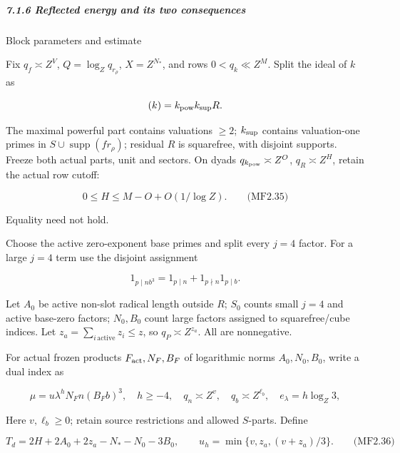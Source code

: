 \hypertarget{reflected-energy-and-its-two-consequences-heading-2}{%
\subparagraph{7.1.6 Reflected energy and its two consequences}}

\hypertarget{block-parameters-and-estimate}{}

\label{block-parameters-and-estimate}

Block parameters and estimate

Fix \(q_f\asymp Z^V\), \(Q=\log_Zq_{r_\rho}\), \(X=Z^{N_*}\), and rows \(0<q_k\ll Z^M\). Split the ideal of \(k\) as

\[
(k)=k_{\rm pow}k_{\rm sup}R.
\]

The maximal powerful part contains valuations \(\ge2\); \(k_{\rm sup}\) contains valuation-one primes in \(S\cup\operatorname{supp}(fr_\rho)\); residual \(R\) is squarefree, with disjoint supports. Freeze both actual parts, unit and sectors. On dyads \(q_{k_{\rm pow}}\asymp Z^O\), \(q_R\asymp Z^H\), retain the actual row cutoff:

\hypertarget{mf:eq:B2.35}{}

\label{mf:eq:B2.35}

\[
0\le H\le M-O+O(1/\log Z).
\qquad\text{(MF2.35)}
\]

Equality need not hold.

Choose the active zero-exponent base primes and split every \(j=4\) factor. For a large \(j=4\) term use the disjoint assignment

\[
1_{p\mid nb^3}=1_{p\mid n}+1_{p\nmid n}1_{p\mid b}.
\]

Let \(A_0\) be active non-slot radical length outside \(R\); \(S_0\) counts small \(j=4\) and active base-zero factors; \(N_0,B_0\) count large factors assigned to squarefree/cube indices. Let \(z_a=\sum_{i\,\mathrm{active}}z_i\le z\), so \(q_P\asymp Z^{z_a}\). All are nonnegative.

For actual frozen products \(F_{\rm act},N_F,B_F\) of logarithmic norms \(A_0,N_0,B_0\), write a dual index as

\[
\mu=u\lambda^hN_Fn(B_Fb)^3,\quad h\ge-4,\quad
q_n\asymp Z^v,\quad q_b\asymp Z^{\ell_b},\quad
e_\lambda=h\log_Z3,
\]

Here \(v,\ell_b\ge0\); retain source restrictions and allowed \(S\)-parts. Define

\hypertarget{mf:eq:B2.36}{}

\label{mf:eq:B2.36}

\[
T_d=2H+2A_0+2z_a-N_*-N_0-3B_0,\qquad
u_h=\min\{v,z_a,(v+z_a)/3\}.
\qquad\text{(MF2.36)}
\]

